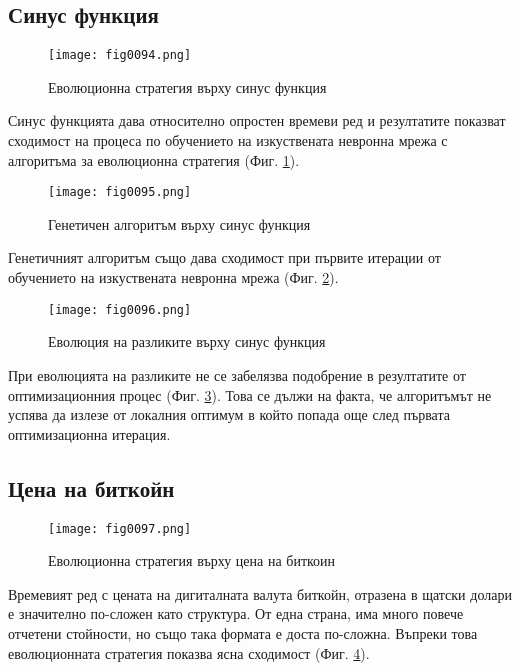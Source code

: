\subsection{Синус функция}

\begin{figure}[H]
  \centering
  \texttt{[image: fig0094.png]}
  \caption{Еволюционна стратегия върху синус функция}
\label{fig0094}
\end{figure}

Синус функцията дава относително опростен времеви ред и резултатите показват сходимост на процеса по обучението на изкуствената невронна мрежа с алгоритъма за еволюционна стратегия (Фиг. \ref{fig0094}).

\begin{figure}[H]
  \centering
  \texttt{[image: fig0095.png]}
  \caption{Генетичен алгоритъм върху синус функция}
\label{fig0095}
\end{figure}

Генетичният алгоритъм също дава сходимост при първите итерации от обучението на изкуствената невронна мрежа (Фиг. \ref{fig0095}).

\begin{figure}[H]
  \centering
  \texttt{[image: fig0096.png]}
  \caption{Еволюция на разликите върху синус функция}
\label{fig0096}
\end{figure}

При еволюцията на разликите не се забелязва подобрение в резултатите от оптимизационния процес (Фиг. \ref{fig0096}). Това се дължи на факта, че алгоритъмът не успява да излезе от локалния оптимум в който попада още след първата оптимизационна итерация. 

\subsection{Цена на биткойн}

\begin{figure}[H]
  \centering
  \texttt{[image: fig0097.png]}
  \caption{Еволюционна стратегия върху цена на биткоин}
\label{fig0097}
\end{figure}

Времевият ред с цената на дигиталната валута биткойн, отразена в щатски долари е значително по-сложен като структура. От една страна, има много повече отчетени стойности, но също така формата е доста по-сложна. Въпреки това еволюционната стратегия показва ясна сходимост (Фиг. \ref{fig0097}).


